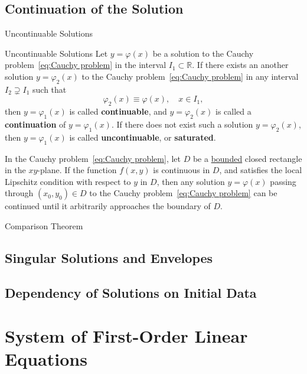 \documentclass[11pt]{../../TexTemplate/elegantbook}
\begin{document}
\section{Continuation of the Solution}
\begin{leftbarTitle}{Uncontinuable Solutions}\end{leftbarTitle}
\begin{definition}{Uncontinuable Solutions}
    Let \(y = \varphi(x)\) be a solution to the Cauchy problem~\eqref{eq:Cauchy problem} in the interval \(I_1\subset \mathbb{R}\).
    If there exists an another solution \(y = \varphi_{2}(x)\) to the Cauchy problem~\eqref{eq:Cauchy problem} 
    in any interval \(I_{2} \supsetneq I_{1}\) such that
    \[
    \varphi_{2}(x) \equiv \varphi(x), \quad x \in I_{1},
    \]
    then \(y = \varphi_{1}(x)\) is called \textbf{continuable},
    and \(y = \varphi_{2}(x)\) is called a \textbf{continuation} of \(y = \varphi_{1}(x)\).
    If there does not exist such a solution \(y = \varphi_{2}(x)\), 
    then \(y = \varphi_{1}(x)\) is called \textbf{uncontinuable}, or \textbf{saturated}.
\end{definition}

\begin{theorem}
    In the Cauchy problem~\eqref{eq:Cauchy problem},
    let \(D\) be a \underline{bounded} closed rectangle in the \(xy\)-plane.
    If the function \(f(x, y)\) is continuous in \(D\),
    and satisfies the local Lipschitz condition with respect to \(y\) in \(D\),
    then any solution \(y = \varphi(x)\) passing through \((x_{0}, y_{0}) \in D\) 
    to the Cauchy problem~\eqref{eq:Cauchy problem} can be continued
    until it arbitrarily approaches the boundary of \(D\).
\end{theorem}

\begin{leftbarTitle}{Comparison Theorem}\end{leftbarTitle}

\section{Singular Solutions and Envelopes}

\section{Dependency of Solutions on Initial Data}

\chapter{System of First-Order Linear Equations}
\end{document}
